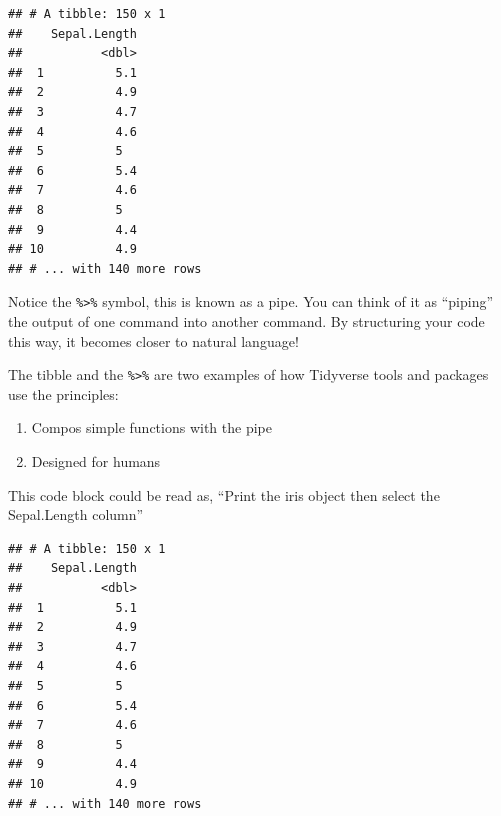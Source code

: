 \documentclass[
]{article}
\newenvironment{Shaded}{\begin{snugshade}}{\end{snugshade}}
\newcommand{\CommentTok}[1]{\textcolor[rgb]{0.56,0.35,0.01}{\textit{#1}}}
\newcommand{\KeywordTok}[1]{\textcolor[rgb]{0.13,0.29,0.53}{\textbf{#1}}}
\newcommand{\NormalTok}[1]{#1}
\newcommand{\OperatorTok}[1]{\textcolor[rgb]{0.81,0.36,0.00}{\textbf{#1}}}
\newcommand{\StringTok}[1]{\textcolor[rgb]{0.31,0.60,0.02}{#1}}
\providecommand{\tightlist}{%
  \setlength{\itemsep}{0pt}\setlength{\parskip}{0pt}}
\begin{document}
\begin{Shaded}
\end{Shaded}

\begin{verbatim}
## # A tibble: 150 x 1
##    Sepal.Length
##           <dbl>
##  1          5.1
##  2          4.9
##  3          4.7
##  4          4.6
##  5          5  
##  6          5.4
##  7          4.6
##  8          5  
##  9          4.4
## 10          4.9
## # ... with 140 more rows
\end{verbatim}

Notice the \texttt{\%\textgreater{}\%} symbol, this is known as a pipe.
You can think of it as ``piping'' the output of one command into another
command. By structuring your code this way, it becomes closer to natural
language!

The tibble and the \texttt{\%\textgreater{}\%} are two examples of how
Tidyverse tools and packages use the principles:

\begin{enumerate}
\def\labelenumi{(\arabic{enumi})}
\tightlist
\item
  Compos simple functions with the pipe
\item
  Designed for humans
\end{enumerate}

This code block could be read as, ``Print the iris object then select
the Sepal.Length column''

\begin{Shaded}
\end{Shaded}

\begin{verbatim}
## # A tibble: 150 x 1
##    Sepal.Length
##           <dbl>
##  1          5.1
##  2          4.9
##  3          4.7
##  4          4.6
##  5          5  
##  6          5.4
##  7          4.6
##  8          5  
##  9          4.4
## 10          4.9
## # ... with 140 more rows
\end{verbatim}
\end{document}
